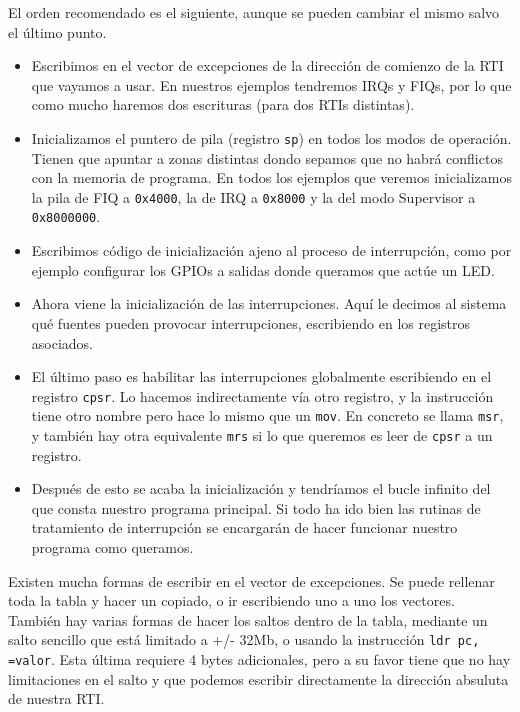 El orden recomendado es el siguiente, aunque se pueden cambiar el mismo salvo el último punto.

\begin{itemize}
  \item Escribimos en el vector de excepciones de la dirección de comienzo de la RTI que vayamos
        a usar. En nuestros ejemplos tendremos IRQs y FIQs, por lo que como mucho haremos dos
        escrituras (para dos RTIs distintas).
  \item Inicializamos el puntero de pila (registro {\tt sp}) en todos los modos de operación.
        Tienen que apuntar a zonas distintas dondo sepamos que no habrá conflictos con la
        memoria de programa. En todos los ejemplos que veremos inicializamos la pila de FIQ
        a {\tt 0x4000}, la de IRQ a {\tt 0x8000} y la del modo Supervisor a {\tt 0x8000000}.
  \item Escribimos código de inicialización ajeno al proceso de interrupción, como por ejemplo
        configurar los GPIOs a salidas donde queramos que actúe un LED.
  \item Ahora viene la inicialización de las interrupciones. Aquí le decimos al sistema qué fuentes
        pueden provocar interrupciones, escribiendo en los registros asociados. 
  \item El último paso es habilitar las interrupciones globalmente escribiendo en el registro
        {\tt cpsr}. Lo hacemos indirectamente vía otro registro, y la instrucción tiene otro
        nombre pero hace lo mismo que un {\tt mov}. En concreto se llama {\tt msr}, y también hay
        otra equivalente {\tt mrs} si lo que queremos es leer de {\tt cpsr} a un registro.
  \item Después de esto se acaba la inicialización y tendríamos el bucle infinito del que consta
        nuestro programa principal. Si todo ha ido bien las rutinas de tratamiento de interrupción
        se encargarán de hacer funcionar nuestro programa como queramos.
\end{itemize}

Existen mucha formas de escribir en el vector de excepciones. Se puede rellenar toda la tabla
y hacer un copiado, o ir escribiendo uno a uno los vectores. También hay varias formas de hacer
los saltos dentro de la tabla, mediante un salto sencillo que está limitado a +/- 32Mb, o usando
la instrucción {\tt ldr pc, =valor}. Esta última requiere 4 bytes adicionales, pero a su favor
tiene que no hay limitaciones en el salto y que podemos escribir directamente la dirección
absuluta de nuestra RTI.

